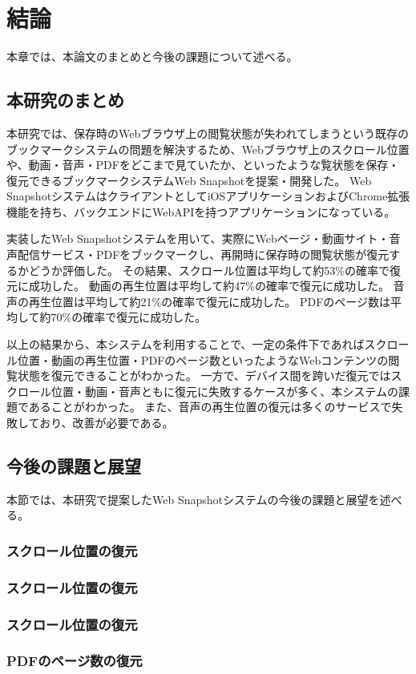 \chapter{結論}
\label{chap:conclusion}
本章では、本論文のまとめと今後の課題について述べる。

\section{本研究のまとめ}
\label{section:conclusion}
本研究では、保存時のWebブラウザ上の閲覧状態が失われてしまうという既存のブックマークシステムの問題を解決するため、Webブラウザ上のスクロール位置や、動画・音声・PDFをどこまで見ていたか、といったような覧状態を保存・復元できるブックマークシステムWeb Snapshotを提案・開発した。
Web SnapshotシステムはクライアントとしてiOSアプリケーションおよびChrome拡張機能を持ち、バックエンドにWebAPIを持つアプリケーションになっている。

実装したWeb Snapshotシステムを用いて、実際にWebページ・動画サイト・音声配信サービス・PDFをブックマークし、再開時に保存時の閲覧状態が復元するかどうか評価した。
その結果、スクロール位置は平均して約53\%の確率で復元に成功した。
動画の再生位置は平均して約47\%の確率で復元に成功した。
音声の再生位置は平均して約21\%の確率で復元に成功した。
PDFのページ数は平均して約70\%の確率で復元に成功した。

以上の結果から、本システムを利用することで、一定の条件下であればスクロール位置・動画の再生位置・PDFのページ数といったようなWebコンテンツの閲覧状態を復元できることがわかった。
一方で、デバイス間を跨いだ復元ではスクロール位置・動画・音声ともに復元に失敗するケースが多く、本システムの課題であることがわかった。
また、音声の再生位置の復元は多くのサービスで失敗しており、改善が必要である。

\section{今後の課題と展望}
本節では、本研究で提案したWeb Snapshotシステムの今後の課題と展望を述べる。

\subsection{スクロール位置の復元}

\subsection{スクロール位置の復元}

\subsection{スクロール位置の復元}

\subsection{PDFのページ数の復元}
